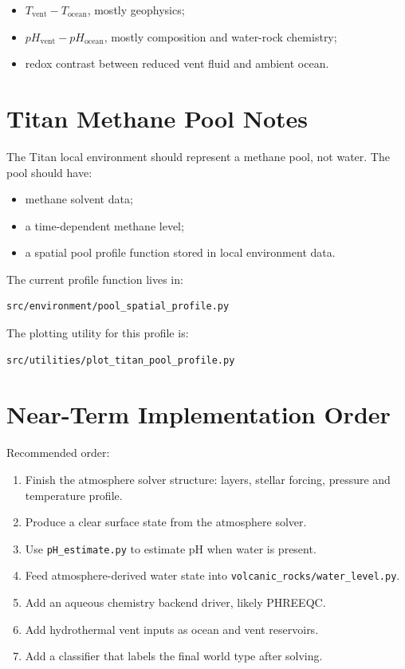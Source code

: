 \documentclass[11pt]{article}
\begin{document}
\begin{itemize}
  \item \(T_{\mathrm{vent}} - T_{\mathrm{ocean}}\), mostly geophysics;
  \item \(pH_{\mathrm{vent}} - pH_{\mathrm{ocean}}\), mostly composition and
        water-rock chemistry;
  \item redox contrast between reduced vent fluid and ambient ocean.
\end{itemize}

\section{Titan Methane Pool Notes}

The Titan local environment should represent a methane pool, not water.
The pool should have:

\begin{itemize}
  \item methane solvent data;
  \item a time-dependent methane level;
  \item a spatial pool profile function stored in local environment data.
\end{itemize}

The current profile function lives in:

\begin{lstlisting}
src/environment/pool_spatial_profile.py
\end{lstlisting}

The plotting utility for this profile is:

\begin{lstlisting}
src/utilities/plot_titan_pool_profile.py
\end{lstlisting}

\section{Near-Term Implementation Order}

Recommended order:

\begin{enumerate}
  \item Finish the atmosphere solver structure: layers, stellar forcing, pressure
        and temperature profile.
  \item Produce a clear surface state from the atmosphere solver.
  \item Use \texttt{pH\_estimate.py} to estimate pH when water is present.
  \item Feed atmosphere-derived water state into
        \texttt{volcanic\_rocks/water\_level.py}.
  \item Add an aqueous chemistry backend driver, likely PHREEQC.
  \item Add hydrothermal vent inputs as ocean and vent reservoirs.
  \item Add a classifier that labels the final world type after solving.
\end{enumerate}
\end{document}
